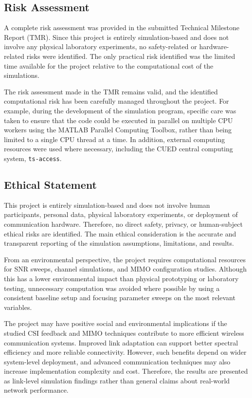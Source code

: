 \documentclass[a4paper,12pt,onecolumn]{article}
\begin{document}
\subsection{Risk Assessment}
	\begin{highlightblock}
	A complete risk assessment was provided in the submitted Technical Milestone Report (TMR). Since this project is entirely simulation-based and does not involve any physical laboratory experiments, no safety-related or hardware-related risks were identified. The only practical risk identified was the limited time available for the project relative to the computational cost of the simulations.
	
	The risk assessment made in the TMR remains valid, and the identified computational risk has been carefully managed throughout the project. For example, during the development of the simulation program, specific care was taken to ensure that the code could be executed in parallel on multiple CPU workers using the MATLAB Parallel Computing Toolbox, rather than being limited to a single CPU thread at a time. In addition, external computing resources were used where necessary, including the CUED central computing system, \texttt{ts-access}.
	\end{highlightblock}
\subsection{Ethical Statement}
	\begin{highlightblock}
	This project is entirely simulation-based and does not involve human participants, personal data, physical laboratory experiments, or deployment of communication hardware. Therefore, no direct safety, privacy, or human-subject ethical risks are identified. The main ethical consideration is the accurate and transparent reporting of the simulation assumptions, limitations, and results.
	
	From an environmental perspective, the project requires computational resources for SNR sweeps, channel simulations, and MIMO configuration studies. Although this has a lower environmental impact than physical prototyping or laboratory testing, unnecessary computation was avoided where possible by using a consistent baseline setup and focusing parameter sweeps on the most relevant variables.
	
	The project may have positive social and environmental implications if the studied CSI feedback and MIMO techniques contribute to more efficient wireless communication systems. Improved link adaptation can support better spectral efficiency and more reliable connectivity. However, such benefits depend on wider system-level deployment, and advanced communication techniques may also increase implementation complexity and cost. Therefore, the results are presented as link-level simulation findings rather than general claims about real-world network performance.
	\end{highlightblock}
\end{document}
